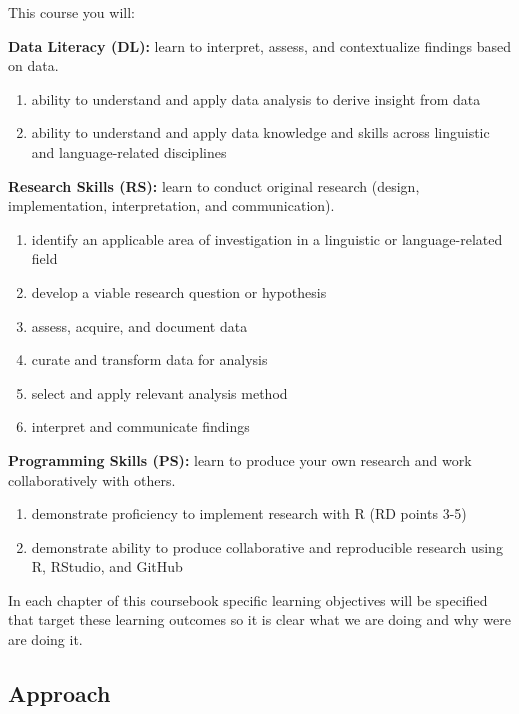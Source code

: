 \documentclass[
]{article}
\providecommand{\tightlist}{%
  \setlength{\itemsep}{0pt}\setlength{\parskip}{0pt}}
\begin{document}
This course you will:

\textbf{Data Literacy (DL):} learn to interpret, assess, and contextualize findings based on data.

\begin{enumerate}
\def\labelenumi{\arabic{enumi}.}
\tightlist
\item
  ability to understand and apply data analysis to derive insight from data
\item
  ability to understand and apply data knowledge and skills across linguistic and language-related disciplines
\end{enumerate}

\textbf{Research Skills (RS):} learn to conduct original research (design, implementation, interpretation, and communication).

\begin{enumerate}
\def\labelenumi{\arabic{enumi}.}
\tightlist
\item
  identify an applicable area of investigation in a linguistic or language-related field
\item
  develop a viable research question or hypothesis
\item
  assess, acquire, and document data
\item
  curate and transform data for analysis
\item
  select and apply relevant analysis method
\item
  interpret and communicate findings
\end{enumerate}

\textbf{Programming Skills (PS):} learn to produce your own research and work collaboratively with others.

\begin{enumerate}
\def\labelenumi{\arabic{enumi}.}
\tightlist
\item
  demonstrate proficiency to implement research with R (RD points 3-5)
\item
  demonstrate ability to produce collaborative and reproducible research using R, RStudio, and GitHub
\end{enumerate}

In each chapter of this coursebook specific learning objectives will be specified that target these learning outcomes so it is clear what we are doing and why were are doing it.

\hypertarget{approach}{%
\subsection{Approach}\label{approach}}
\end{document}
